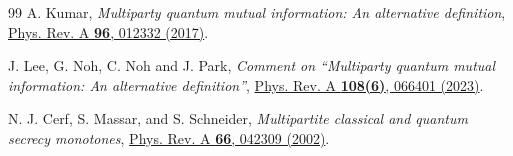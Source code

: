 \documentclass[aps,onecolumn,qic,superscriptaddress,11pt]{revtex4-1}
\begin{document}
\begin{thebibliography}{99}%
 A. Kumar, {\it Multiparty quantum mutual information: An alternative definition}, \href{https://doi.org/10.1103/PhysRevA.96.012332}{Phys. Rev. A {\bf 96}, 012332 (2017)}.

 J. Lee, G. Noh, C. Noh and J. Park, {\it Comment on ``Multiparty quantum mutual information: An alternative definition''}, \href{https://doi.org/10.1103/PhysRevA.108.066401}{Phys. Rev. A {\bf 108(6)}, 066401 (2023)}.

 N. J. Cerf, S. Massar, and S. Schneider, {\it Multipartite classical and quantum secrecy monotones}, \href{https://doi.org/10.1103/PhysRevA.66.042309}{Phys. Rev. A {\bf 66}, 042309 (2002)}.

\end{thebibliography}%
\end{document}

